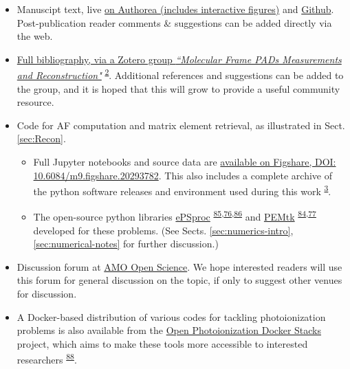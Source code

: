 \documentclass[10pt]{article}
\begin{document}
\begin{itemize}
\item Manuscipt text, live \href{https://www.authorea.com/users/71114/articles/447808-extracting-molecular-frame-photoionization-dynamics-from-experimental-data}{on Authorea (includes interactive figures)} and \href{https://github.com/phockett/Extracting-Molecular-Frame-Photoionization-Dynamics-from-Experimental-Data}{Github}. Post-publication reader comments \& suggestions can be added directly via the web.
\item \href{https://www.zotero.org/groups/4733878/molecular_frame_pads_measurements_and_reconstruction}{Full bibliography, via a Zotero group \textit{``Molecular Frame PADs Measurements and Reconstruction"}} \textsuperscript{\hyperref[csl:2]{2}}. Additional references and suggestions can be added to the group, and it is hoped that this will grow to provide a useful community resource.
\item Code for AF computation and matrix element retrieval, as illustrated in Sect. \ref{sec:Recon}. 
\begin{itemize}
\item Full Jupyter notebooks and source data are \href{http://dx.doi.org/10.6084/m9.figshare.20293782}{available on Figshare, DOI: 10.6084/m9.figshare.20293782}. This also includes a complete archive of the python software releases and environment used during this work \textsuperscript{\hyperref[csl:3]{3}}.
\item The open-source python libraries \href{https://epsproc.readthedocs.io}{ePSproc} \textsuperscript{\hyperref[csl:85]{85},\hyperref[csl:76]{76},\hyperref[csl:86]{86}} and \href{https://pemtk.readthedocs.io}{PEMtk} \textsuperscript{\hyperref[csl:84]{84},\hyperref[csl:77]{77}} developed for these problems. (See Sects. \ref{sec:numerics-intro}, \ref{sec:numerical-notes} for further discussion.)
\end{itemize}
\item Discussion forum at \href{https://amoopenscience.femtolab.ca/}{AMO Open Science}. We hope interested readers will use this forum for general discussion on the topic, if only to suggest other venues for discussion.
\item A Docker-based distribution of various codes for tackling photoionization problems is also available from the \href{https://github.com/phockett/open-photoionization-docker-stacks}{Open Photoionization Docker Stacks} project, which aims to make these tools more accessible to interested researchers \textsuperscript{\hyperref[csl:88]{88}}.
\end{itemize}
\end{document}
